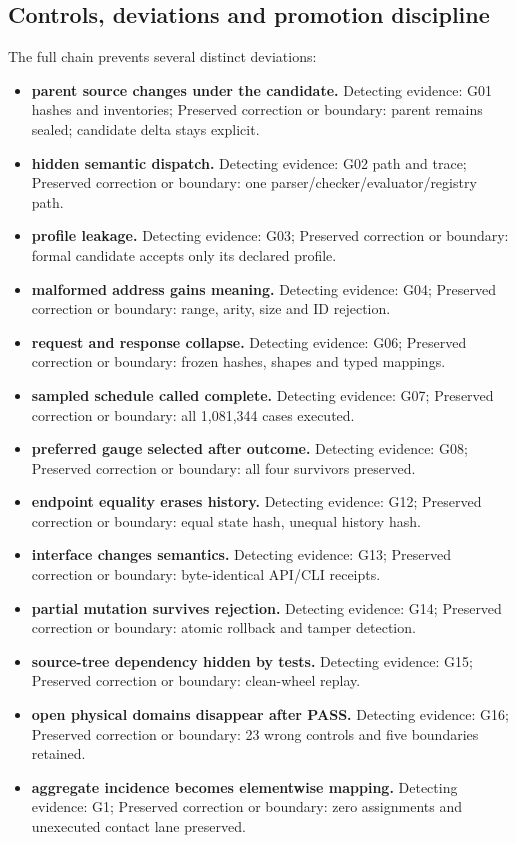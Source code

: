 \subsection{Controls, deviations and promotion
discipline}\label{viii-ch02-controls-deviations-and-promotion-discipline}

The full chain prevents several distinct deviations:

\begin{itemize}
\tightlist
\item
  \textbf{parent source changes under the candidate.} Detecting
  evidence: G01 hashes and inventories; Preserved correction or
  boundary: parent remains sealed; candidate delta stays explicit.
\item
  \textbf{hidden semantic dispatch.} Detecting evidence: G02 path and
  trace; Preserved correction or boundary: one
  parser/checker/evaluator/registry path.
\item
  \textbf{profile leakage.} Detecting evidence: G03; Preserved
  correction or boundary: formal candidate accepts only its declared
  profile.
\item
  \textbf{malformed address gains meaning.} Detecting evidence: G04;
  Preserved correction or boundary: range, arity, size and ID rejection.
\item
  \textbf{request and response collapse.} Detecting evidence: G06;
  Preserved correction or boundary: frozen hashes, shapes and typed
  mappings.
\item
  \textbf{sampled schedule called complete.} Detecting evidence: G07;
  Preserved correction or boundary: all 1,081,344 cases executed.
\item
  \textbf{preferred gauge selected after outcome.} Detecting evidence:
  G08; Preserved correction or boundary: all four survivors preserved.
\item
  \textbf{endpoint equality erases history.} Detecting evidence: G12;
  Preserved correction or boundary: equal state hash, unequal history
  hash.
\item
  \textbf{interface changes semantics.} Detecting evidence: G13;
  Preserved correction or boundary: byte-identical API/CLI receipts.
\item
  \textbf{partial mutation survives rejection.} Detecting evidence: G14;
  Preserved correction or boundary: atomic rollback and tamper
  detection.
\item
  \textbf{source-tree dependency hidden by tests.} Detecting evidence:
  G15; Preserved correction or boundary: clean-wheel replay.
\item
  \textbf{open physical domains disappear after PASS.} Detecting
  evidence: G16; Preserved correction or boundary: 23 wrong controls and
  five boundaries retained.
\item
  \textbf{aggregate incidence becomes elementwise mapping.} Detecting
  evidence: G1; Preserved correction or boundary: zero assignments and
  unexecuted contact lane preserved.
\end{itemize}

